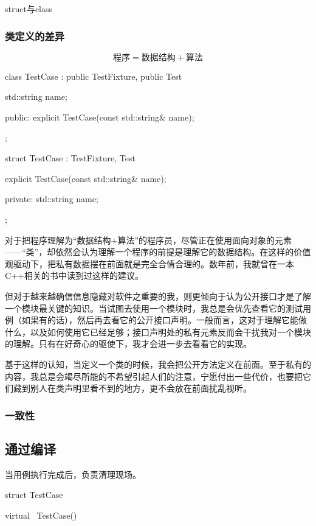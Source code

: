 \begin{content}
\begin{episode}{struct与class}
\begin{content}
\subsubsection{类定义的差异}

\[\text{程序} = \text{数据结构} + \text{算法}\]

\begin{c++}
class TestCase : public TestFixture, public Test {
  std::string name;

public:
  explicit TestCase(const std::string& name);
};

struct TestCase : TestFixture, Test {
  explicit TestCase(const std::string& name);

private:
  std::string name;
};
\end{c++}

对于把程序理解为“数据结构+算法”的程序员，尽管正在使用面向对象的元素——“类”，却依然会认为理解一个程序的前提是理解它的数据结构。在这样的价值观驱动下，把私有数据摆在前面就是完全合情合理的。数年前，我就曾在一本C++相关的书中读到过这样的建议。

但对于越来越确信信息隐藏对软件之重要的我，则更倾向于认为公开接口才是了解一个模块最关键的知识。当试图去使用一个模块时，我总是会优先查看它的测试用例（如果有的话），然后再去看它的公开接口声明。一般而言，这对于理解它能做什么，以及如何使用它已经足够；接口声明处的私有元素反而会干扰我对一个模块的理解。只有在好奇心的驱使下，我才会进一步去看看它的实现。

基于这样的认知，当定义一个类的时候，我会把公开方法定义在前面。至于私有的内容，我总是会竭尽所能的不希望引起人们的注意，宁愿付出一些代价，也要把它们藏到别人在类声明里看不到的地方，更不会放在前面扰乱视听。

\subsubsection{一致性}

\end{content}
\end{episode}

\subsection{通过编译}

当用例执行完成后，负责清理现场。

\begin{leftbar}
 \begin{c++}[caption={\ttfamily{include/mars/core/TestCase.h}}]
struct TestCase {
  virtual ~TestCase() {}

}
\end{c++}
\end{leftbar}
\end{content}
